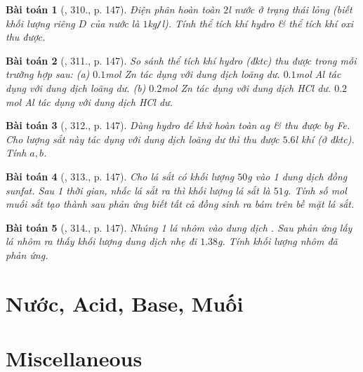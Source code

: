 \documentclass{article}
\newtheorem{baitoan}{Bài toán}
\begin{document}
\begin{baitoan}[\cite{An_400_BT_Hoa_Hoc_8_2020}, 310., p. 147]
	Điện phân hoàn toàn $2$\emph{l} nước ở trạng thái lỏng (biết khối lượng riêng $D$ của nước là $1$\emph{kg\texttt{/}l}). Tính thể tích khí hydro \& thể tích khí oxi thu được.
\end{baitoan}

\begin{baitoan}[\cite{An_400_BT_Hoa_Hoc_8_2020}, 311., p. 147]
	So sánh thể tích khí hydro (đktc) thu được trong mỗi trường hợp sau: (a) $0.1$\emph{mol Zn} tác dụng với dung dịch \emph{} loãng dư. $0.1$\emph{mol Al} tác dụng với dung dịch \emph{} loãng dư. (b) $0.2$\emph{mol Zn} tác dụng với dung dịch \emph{HCl} dư. $0.2$\emph{mol Al} tác dụng với dung dịch \emph{HCl} dư.
\end{baitoan}

\begin{baitoan}[\cite{An_400_BT_Hoa_Hoc_8_2020}, 312., p. 147]
	Dùng hydro để khử hoàn toàn $a$\emph{g} \emph{} \& thu được $b$\emph{g Fe}. Cho lượng sắt này tác dụng với dung dịch \emph{} loãng dư thì thu được $5.6$\emph{l} khí \emph{} (ở đktc). Tính $a,b$.
\end{baitoan}

\begin{baitoan}[\cite{An_400_BT_Hoa_Hoc_8_2020}, 313., p. 147]
	Cho lá sắt có khối lượng $50$\emph{g} vào 1 dung dịch đồng sunfat. Sau 1 thời gian, nhấc lá sắt ra thì khối lượng lá sắt là $51$\emph{g}. Tính số \emph{mol} muối sắt tạo thành sau phản ứng biết tất cả đồng sinh ra bám trên bề mặt lá sắt.
\end{baitoan}

\begin{baitoan}[\cite{An_400_BT_Hoa_Hoc_8_2020}, 314., p. 147]
	Nhúng 1 lá nhôm vào dung dịch \emph{}. Sau phản ứng lấy lá nhôm ra thấy khối lượng dung dịch nhẹ đi $1.38$\emph{g}. Tính khối lượng nhôm đã phản ứng.
\end{baitoan}


\section{Nước, Acid, Base, Muối}


\section{Miscellaneous}


\printbibliography[heading=bibintoc]
	
\end{document}
